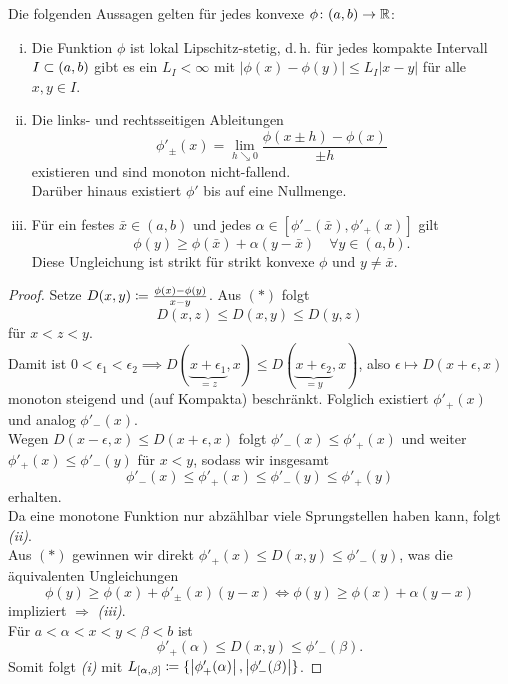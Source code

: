 \documentclass[skript.tex]{subfiles}
\begin{document}
	\begin{lem}
		Die folgenden Aussagen gelten für jedes konvexe $\phi \colon (a,b) \to \mathbb{R}$:
		\begin{enumerate}[(i)]
			\item Die Funktion $\phi$ ist lokal Lipschitz-stetig, d.\,h. für jedes kompakte Intervall $I\subset(a,b)$ gibt es ein $L_I < \infty$ mit $|\phi(x)-\phi(y)| \leq L_I |x-y|$ für alle $x,y \in I$.
			\item Die links- und rechtsseitigen Ableitungen
			\[
				\phi'_\pm(x) = \lim_{h \searrow 0} \frac{\phi(x\pm h)-\phi(x)}{\pm h}
			\]
			existieren und sind monoton nicht-fallend.\\
			Darüber hinaus existiert $\phi'$ bis auf eine Nullmenge.
			\item Für ein festes $\bar{x} \in (a,b)$ und jedes $\alpha \in [\phi'_-(\bar{x}),\phi'_+(x)]$ gilt
			\[
				\phi(y) \geq \phi(\bar{x}) + \alpha (y-\bar{x}) \quad\forall y \in (a,b).
			\]
			Diese Ungleichung ist strikt für strikt konvexe $\phi$ und $y \neq \bar{x}$.
		\end{enumerate}
	\end{lem}
	\begin{proof}
		Setze $D(x,y) \coloneqq \frac{\phi(x)-\phi(y)}{x-y}$. Aus $(\ast)$ folgt
		\[
			D(x,z) \leq D(x,y) \leq D(y,z)
		\]
		für $x<z<y$.\\
		Damit ist $0 < \epsilon_1 < \epsilon_2 \implies D(\underbrace{x+\epsilon_1}_{=z},x) \leq D(\underbrace{x+\epsilon_2}_{=y},x)$, also $\epsilon \mapsto D(x+\epsilon,x)$ monoton steigend und (auf Kompakta) beschränkt. Folglich existiert $\phi'_+(x)$ und analog $\phi'_-(x)$.\\
		Wegen $D(x-\epsilon,x) \leq D(x+\epsilon,x)$ folgt $\phi'_-(x) \leq \phi'_+(x)$ und weiter $\phi'_+(x) \leq \phi'_-(y)$ für $x<y$, sodass wir insgesamt
		\[
			\phi'_-(x) \leq \phi'_+(x) \leq \phi'_-(y) \leq \phi'_+(y)
		\]
		erhalten.\\
		Da eine monotone Funktion nur abzählbar viele Sprungstellen haben kann, folgt \emph{(ii)}.\\
		Aus $(\ast)$ gewinnen wir direkt $\phi'_+(x) \leq D(x,y) \leq \phi'_-(y)$, was die äquivalenten Ungleichungen
		\[
			\phi(y) \geq \phi(x) + \phi'_\pm(x)(y-x)
			\iff \phi(y) \geq \phi(x) + \alpha(y-x)
		\]
		impliziert $\Rightarrow$ \emph{(iii)}.\\
		
		Für $a<\alpha<x<y<\beta<b$ ist
		\[
			\phi'_+(\alpha) \leq D(x,y) \leq \phi'_-(\beta).
		\]
		Somit folgt \emph{(i)} mit $L_{[\alpha,\beta]} \coloneqq\{\left| \phi'_+(\alpha) \right|,\left| \phi'_-(\beta) \right|\}$.
	\end{proof}
\end{document}
